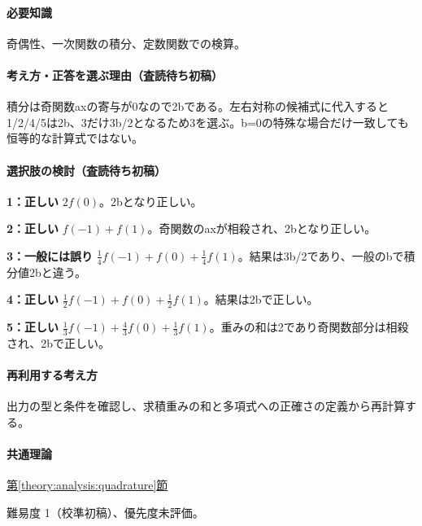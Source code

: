 \paragraph{必要知識} 奇偶性、一次関数の積分、定数関数での検算。

\paragraph{考え方・正答を選ぶ理由（査読待ち初稿）} 積分は奇関数axの寄与が0なので2bである。左右対称の候補式に代入すると1/2/4/5は2b、3だけ3b/2となるため3を選ぶ。b=\allowbreak{}0の特殊な場合だけ一致しても恒等的な計算式ではない。

\paragraph{選択肢の検討（査読待ち初稿）}\mbox{}\par

\noindent\textbf{1：正しい} \(2f(0)\)。2bとなり正しい。\par

\noindent\textbf{2：正しい} \(f(-1)+f(1)\)。奇関数のaxが相殺され、2bとなり正しい。\par

\noindent\textbf{3：一般には誤り} \(\frac14f(-1)+f(0)+\frac14f(1)\)。結果は3b/2であり、一般のbで積分値2bと違う。\par

\noindent\textbf{4：正しい} \(\frac12f(-1)+f(0)+\frac12f(1)\)。結果は2bで正しい。\par

\noindent\textbf{5：正しい} \(\frac13f(-1)+\frac43f(0)+\frac13f(1)\)。重みの和は2であり奇関数部分は相殺され、2bで正しい。\par

\paragraph{再利用する考え方} 出力の型と条件を確認し、求積重みの和と多項式への正確さの定義から再計算する。

\paragraph{共通理論} \hyperref[theory:analysis:quadrature]{第\ref*{theory:analysis:quadrature}節}

\par 難易度 1（校準初稿）、優先度未評価。

